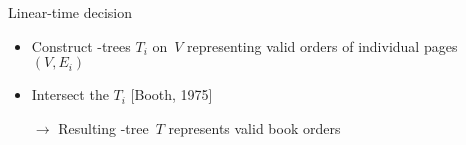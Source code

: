 \begin{frame}[fragile]{Linear-time decision}
\begin{overprint}
\begin{itemize}
\begin{figure}
{}
\end{figure}
\end{itemize}

\begin{itemize}
\item Construct \PQ-trees $T_i$ on~$V$ representing valid orders of individual pages
$(V,E_i)$
\item Intersect the $T_i$ [Booth, 1975]
\item[$\rightarrow$] Resulting \PQ-tree~$T$ represents valid book orders
\end{itemize}
\end{overprint}

\end{frame}
